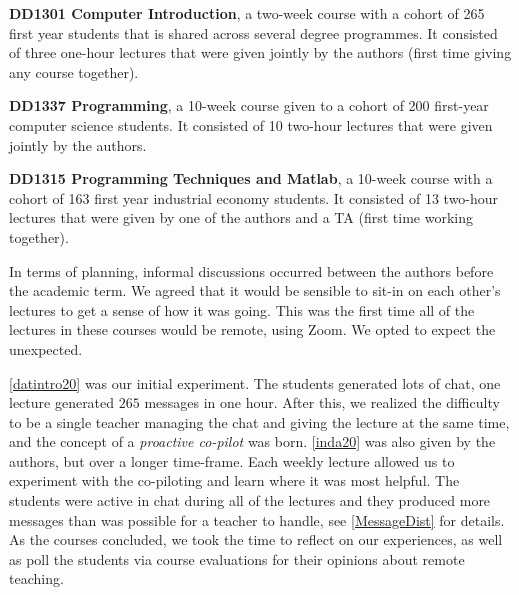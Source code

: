 \documentclass[sigconf,natbib=false]{acmart}
\begin{document}
\begin{courses}
  \item\label{datintro20} \textbf{DD1301 Computer Introduction}, a two-week 
    course with a cohort of 265 first year students that is shared across 
 several degree programmes. It consisted of three one-hour lectures that 
    were given jointly by the authors (first time giving any course together).

  \item\label{inda20} \textbf{DD1337 Programming}, a 10-week course given to a 
    cohort of 200 first-year computer science students. It consisted of 10 
    two-hour lectures that were given jointly by the authors.

  \item\label{prgi20} \textbf{DD1315 Programming Techniques and Matlab}, a 
    10-week course with a cohort of 163 first year industrial economy students. 
    It consisted of 13 two-hour lectures that were given by one of the authors 
    and a \ac{TA} (first time working together).
\end{courses}

In terms of planning, informal discussions occurred between the authors before 
the academic term. We agreed that it would be sensible to sit-in on each 
other's lectures to get a sense of how it was going. This was the first time 
all of the lectures in these courses would be remote, using Zoom. We opted to 
expect the unexpected.

\ref{datintro20} was our initial experiment. The students generated lots of 
chat, \eg one lecture generated $265$ messages in one hour. After this, we 
realized the difficulty to be a single teacher managing the chat and giving the 
lecture at the same time, and the concept of a \emph{proactive co-pilot} was 
born. \ref{inda20} was also given by the authors, but over a longer time-frame. 
Each weekly lecture allowed us to experiment with the co-piloting and learn 
where it was most helpful. The students were active in chat during all of the 
lectures and they produced more messages than was possible for a teacher to 
handle, see \cref{MessageDist} for details. As the courses concluded, we took 
the time to reflect on our experiences, as well as poll the students via course 
evaluations for their opinions about remote teaching.
\end{document}
